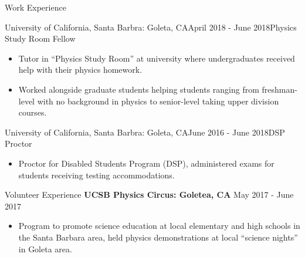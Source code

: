 \documentclass{resume} %
\begin{document}
\begin{rSection}{Work Experience}
\begin{rSubsection}{University of California, Santa Barbra: Goleta, CA}{April 2018 - June 2018}{Physics Study Room Fellow}{}
\begin{itemize}
    \item Tutor in “Physics Study Room” at university where undergraduates received help with their physics homework.
    \item Worked alongside graduate students helping students ranging from freshman-level with no background in physics to senior-level taking upper division courses.
\end{itemize}
\end{rSubsection}

\begin{rSubsection}{University of California, Santa Barbra: Goleta, CA}{June 2016 - June 2018}{DSP Proctor}{}
\begin{itemize}
    \item Proctor for Disabled Students Program (DSP), administered exams for students receiving testing accommodations.
\end{itemize}
\end{rSubsection}

\end{rSection}


\begin{rSection}{Volunteer Experience}
{\bf UCSB Physics Circus: Goletea, CA} \hfill {May 2017 - June 2017}
\begin{itemize}
    \item Program to promote science education at local elementary and high schools in the Santa Barbara area, held physics demonstrations at local “science nights” in Goleta area.
\end{itemize}
\end{rSection}
\end{document}
